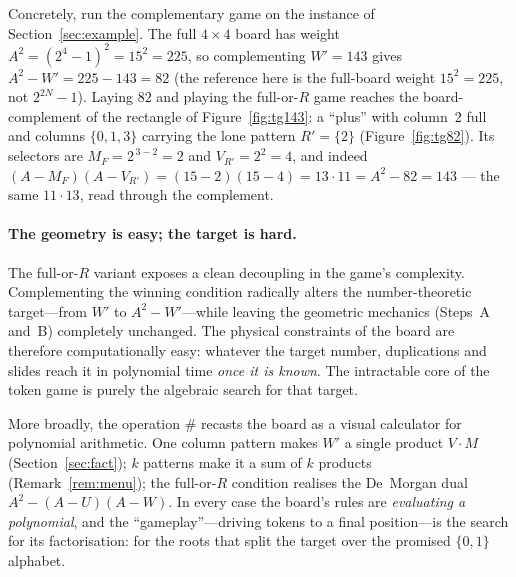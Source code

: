 \documentclass[11pt]{article}
\theoremstyle{definition}
\theoremstyle{plain}
\theoremstyle{remark}
\begin{document}
\medskip
Concretely, run the complementary game on the instance of Section~\ref{sec:example}. The
full $4\times4$ board has weight $A^2=(2^4-1)^2=15^2=225$, so complementing $W'=143$ gives
$A^2-W'=225-143=82$ (the reference here is the full-board weight $15^2=225$, not
$2^{2N}-1$). Laying $82$ and playing the full-or-$R$ game reaches the board-complement of
the rectangle of Figure~\ref{fig:tg143}: a ``plus'' with column~$2$ full and columns
$\{0,1,3\}$ carrying the lone pattern $R'=\{2\}$ (Figure~\ref{fig:tg82}). Its selectors are
$M_F=2^{\,3-2}=2$ and $V_{R'}=2^2=4$, and indeed
$(A-M_F)(A-V_{R'})=(15-2)(15-4)=13\cdot 11=A^2-82=143$ --- the same $11\cdot 13$, read
through the complement.

\paragraph{The geometry is easy; the target is hard.}
The full-or-$R$ variant exposes a clean decoupling in the game's complexity. Complementing the
winning condition radically alters the number-theoretic target---from $W'$ to $A^2-W'$---while
leaving the geometric mechanics (Steps~A and~B) completely unchanged. The physical constraints
of the board are therefore computationally easy: whatever the target number, duplications and
slides reach it in polynomial time \emph{once it is known}. The intractable core of the token
game is purely the algebraic search for that target.

More broadly, the operation $\#$ recasts the board as a visual calculator for polynomial
arithmetic. One column pattern makes $W'$ a single product $V\cdot M$ (Section~\ref{sec:fact});
$k$ patterns make it a sum of $k$ products (Remark~\ref{rem:menu}); the full-or-$R$ condition
realises the De~Morgan dual $A^2-(A-U)(A-W)$. In every case the board's rules are
\emph{evaluating a polynomial}, and the ``gameplay''---driving tokens to a final
position---is the search for its factorisation: for the roots that split the target over the
promised $\{0,1\}$ alphabet.
\end{document}
